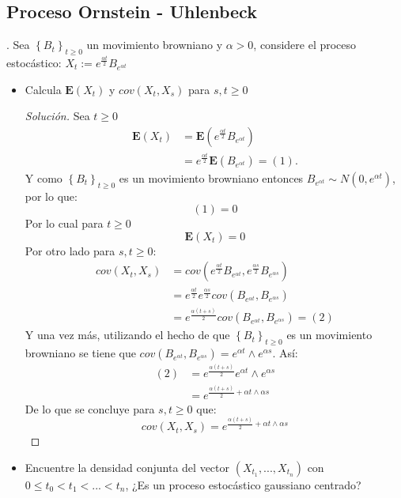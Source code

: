 \documentclass[11pt,notitlepage]{article}
\newenvironment{solucion}
  {\begin{proof}[Solución]}
  {\end{proof}}
\begin{document}
\subsection{Proceso Ornstein - Uhlenbeck}. Sea \(\left \{ B_{t} \right \}_{t\geq 0}\) un movimiento browniano y \(\alpha > 0\), considere el proceso estocástico: \(X_{t}:= e^{\frac{\alpha t}{2}}B_{e^{\alpha t}} \) 
\begin{itemize}
    \item Calcula \(\mathbf{E}(X_{t})\) y \(cov(X_{t},X_{s})\) para \(s,t \geq 0 \) 
    \begin{solucion}
    Sea \(t \geq 0\) 
    \begin{align*}
        \mathbf{E}(X_{t}) &= \mathbf{E}(e^{\frac{\alpha t}{2}}B_{e^{\alpha t}}) \\ 
                          &=e^{\frac{\alpha t}{2}}\mathbf{E}(B_{e^{\alpha t}}) = (1).
    \end{align*}
    Y como \(\left \{ B_{t} \right \}_{t\geq 0}\) es un movimiento browniano entonces \(B_{e^{\alpha t}} \sim N(0,e^{\alpha t})\), por lo que:
    \[(1) = 0 \]
    Por lo cual para \(t \geq 0 \) 
    \[\mathbf{E}(X_{t}) = 0 \]  
    Por otro lado para \(s,t \geq 0 \): 
    \begin{align*}
        cov(X_{t},X_{s}) &= cov(e^{\frac{\alpha t}{2}}B_{e^{\alpha t}},e^{\frac{\alpha s}{2}}B_{e^{\alpha s}})   \\
                         &= e^{\frac{\alpha t}{2}}e^{\frac{\alpha s}{2}}cov(B_{e^{\alpha t}},B_{e^{\alpha s}})                      \\
                         &=e^{\frac{\alpha(t + s)}{2}}cov(B_{e^{\alpha t}},B_{e^{\alpha s}}) = (2) 
    \end{align*}
    Y una vez más, utilizando el hecho de que \(\left \{ B_{t} \right \}_{t\geq 0}\) es un movimiento browniano se tiene que \(cov(B_{e^{\alpha t}},B_{e^{\alpha s}}) =e^{\alpha t}\wedge e^{\alpha s} \).
    Así: 
    \begin{align*}
         (2) &= e^{\frac{\alpha(t + s)}{2}}e^{\alpha t}\wedge e^{\alpha s} \\ 
             &= e^{\frac{\alpha(t + s)}{2} + \alpha t\wedge\alpha s }
    \end{align*}
    De lo que se concluye para \(s,t \geq 0 \) que:
    \[cov(X_{t},X_{s}) =  e^{\frac{\alpha(t + s)}{2} + \alpha t\wedge\alpha s }\] 
    \end{solucion}
  \item Encuentre la densidad conjunta del vector \((X_{t_{1}},...,X_{t_{n}})\) con \(0 \leq t_{0} < t_{1} < ... < t_{n}\), ¿Es un proceso estocástico gaussiano centrado?

\end{itemize}
\end{document}
